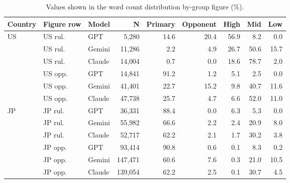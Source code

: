 \begin{table}[t]
\centering
\footnotesize
\setlength{\tabcolsep}{2.4pt}
\caption{Values shown in the word count distribution by-group figure (\%).}
\label{tab:wc-by-group-values}
\begin{tabular}{lllrrrrrr}
\toprule
\textbf{Country} & \textbf{Figure row} & \textbf{Model} & \textbf{N} & \textbf{Primary} & \textbf{Opponent} & \textbf{High} & \textbf{Mid} & \textbf{Low} \\
\midrule
US & US rul. & GPT & 5{,}280 & 14.6 & 20.4 & 56.9 & 8.2 & 0.0 \\
 & US rul. & Gemini & 11{,}286 & 2.2 & 4.9 & 26.7 & 50.6 & 15.7 \\
 & US rul. & Claude & 14{,}004 & 0.7 & 0.0 & 18.6 & 78.7 & 2.0 \\
 & US opp. & GPT & 14{,}841 & 91.2 & 1.2 & 5.1 & 2.5 & 0.0 \\
 & US opp. & Gemini & 41{,}401 & 22.7 & 15.2 & 9.8 & 40.7 & 11.6 \\
 & US opp. & Claude & 47{,}738 & 25.7 & 4.7 & 6.6 & 52.0 & 11.0 \\
\cmidrule(lr){1-9}
JP & JP rul. & GPT & 36{,}331 & 88.4 & 0.0 & 6.3 & 5.3 & 0.0 \\
 & JP rul. & Gemini & 55{,}982 & 66.6 & 2.2 & 2.4 & 20.9 & 8.0 \\
 & JP rul. & Claude & 52{,}717 & 62.2 & 2.1 & 1.7 & 30.2 & 3.8 \\
 & JP opp. & GPT & 93{,}414 & 90.8 & 0.6 & 0.1 & 8.3 & 0.2 \\
 & JP opp. & Gemini & 147{,}471 & 60.6 & 7.6 & 0.3 & 21.0 & 10.5 \\
 & JP opp. & Claude & 139{,}054 & 62.2 & 2.5 & 0.1 & 30.7 & 4.5 \\
\bottomrule
\end{tabular}
\end{table}
